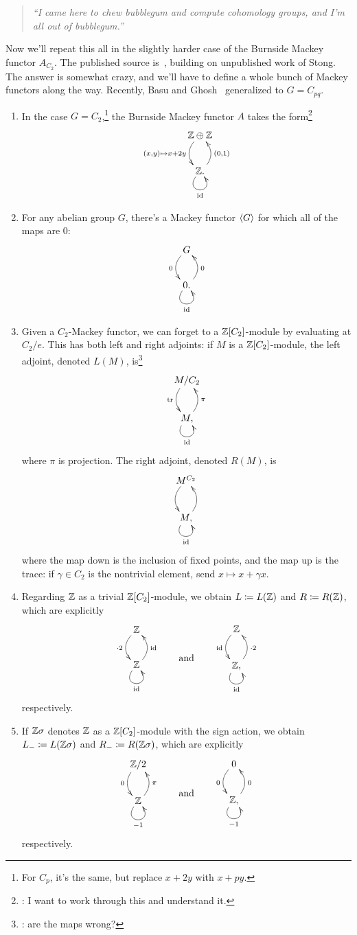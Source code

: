 \begin{quote}\textit{
	``I came here to chew bubblegum and compute cohomology groups, and I'm all out of bubblegum.''
}\end{quote}
Now we'll repeat this all in the slightly harder case of the Burnside Mackey functor $A_{C_2}$. The published
source is~\cite{Lew88}, building on unpublished work of Stong. The answer is somewhat crazy, and we'll have to
define a whole bunch of Mackey functors along the way. Recently, Basu and Ghosh~\cite{BasuGhosh} generalized to $G
= C_{pq}$.
\begin{beast}\hfill
\label{best_bestiary}
\begin{enumerate}
	\item In the case $G = C_2$,\footnote{For $C_p$, it's the same, but replace $x+2y$ with $x+py$.} the Burnside
	Mackey functor $A$ takes the form\footnote{\TODO: I want to work through this and understand it.}
	\begin{equation}
	\label{burnmack}
	\gathxy{
		\Z\oplus\Z\ar@/_0.4cm/[d]_{(x,y)\mapsto x+2y}\\
		\Z.\ar@(dl,dr)_\id\ar@/_0.4cm/[u]_{(0,1)}
	}
	\end{equation}
	\item For any abelian group $G$, there's a Mackey functor $\langle G\rangle$ for which all of the maps are $0$:
	\[\xymatrix{
		G\ar@/_0.4cm/[d]_0\\
		0.\ar@(dl,dr)_\id\ar@/_0.4cm/[u]_0
	}\]
	\item Given a $C_2$-Mackey functor, we can forget to a $\mathbb Z[C_2]$-module by evaluating at $C_2/e$. This has
	both left and right adjoints: if $M$ is a $\mathbb Z[C_2]$-module, the left adjoint, denoted $L(M)$, is\footnote{\TODO:
	are the maps wrong?}
	\[\xymatrix{
		M/C_2\ar@/_0.4cm/[d]_\tr\\
		M,\ar@(dl,dr)_\id\ar@/_0.4cm/[u]_\pi
	}\]
	where $\pi$ is projection. The right adjoint, denoted $R(M)$, is
	\[\xymatrix{
		M^{C_2}\ar@/_0.4cm/[d]\\
		M,\ar@(dl,dr)_\id\ar@/_0.4cm/[u]
	}\]
	where the map down is the inclusion of fixed points, and the map up is the trace: if $\gamma\in C_2$ is the
	nontrivial element, send $x\mapsto x+\gamma x$.
	\item Regarding $\mathbb Z$ as a trivial $\mathbb Z[C_2]$-module, we obtain $L\coloneqq L(\mathbb Z)$ and $R\coloneqq R(\mathbb Z)$, which
	are explicitly
	\[\gathxy{
		\Z\ar@/_0.4cm/[d]_{\cdot 2}\\
		\Z\ar@(dl,dr)_\id\ar@/_0.4cm/[u]_\id
	}\qquad\text{and}\qquad
	\gathxy{
		\Z\ar@/_0.4cm/[d]_\id\\
		\Z,\ar@(dl,dr)_\id\ar@/_0.4cm/[u]_{\cdot 2}
	}
	\]
	respectively.
	\item If $\mathbb Z\sigma$ denotes $\mathbb Z$ as a $\mathbb Z[C_2]$-module with the sign action, we obtain $L_-\coloneqq
	L(\mathbb Z\sigma)$ and $R_-\coloneqq R(\mathbb Z\sigma)$, which are explicitly
	\[\gathxy{
		\Z/2\ar@/_0.4cm/[d]_0\\
		\Z\ar@(dl,dr)_{-1}\ar@/_0.4cm/[u]_\pi
	}\qquad\text{and}\qquad
	\gathxy{
		0\ar@/_0.4cm/[d]_0\\
		\Z,\ar@(dl,dr)_{-1}\ar@/_0.4cm/[u]_0
	}
	\]
	respectively.
\end{enumerate}
\end{beast}
